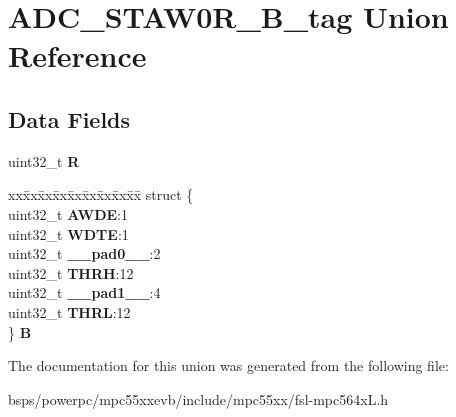 \hypertarget{unionADC__STAW0R__32B__tag}{}\section{A\+D\+C\+\_\+\+S\+T\+A\+W0\+R\+\_\+B\+\_\+tag Union Reference}
\label{unionADC__STAW0R__32B__tag}
\subsection*{Data Fields}
\begin{DoxyCompactItemize}
\item 
\mbox{\label{unionADC__STAW0R__32B__tag_a6aa686b8277f883f4c237687225e6703}} 
uint32\+\_\+t {\bfseries R}
\item 
\mbox{\label{unionADC__STAW0R__32B__tag_aae0598ea0c40abea65afe98728a79fbe}} 
\begin{tabbing}
xx\=xx\=xx\=xx\=xx\=xx\=xx\=xx\=xx\=\kill
struct \{\\
\>uint32\_t {\bfseries AWDE}:1\\
\>uint32\_t {\bfseries WDTE}:1\\
\>uint32\_t {\bfseries \_\_pad0\_\_}:2\\
\>uint32\_t {\bfseries THRH}:12\\
\>uint32\_t {\bfseries \_\_pad1\_\_}:4\\
\>uint32\_t {\bfseries THRL}:12\\
\} {\bfseries B}\\

\end{tabbing}\end{DoxyCompactItemize}


The documentation for this union was generated from the following file\+:\begin{DoxyCompactItemize}
\item 
bsps/powerpc/mpc55xxevb/include/mpc55xx/fsl-\/mpc564x\+L.\+h\end{DoxyCompactItemize}
